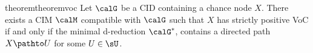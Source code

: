 









\begin{restatable}{theorem}{theoremvoc}%
\label{thm:voc}
Let $\calG$ be a CID containing a chance node $X$.
There exists a CIM $\calM$ compatible with $\calG$ 
such that $X$ has 
strictly 
positive VoC %
if and only if the minimal d-reduction $\calG^*$,
contains a 
directed
path $X \pathto U$ for some $U \in \sU$.
\end{restatable}

